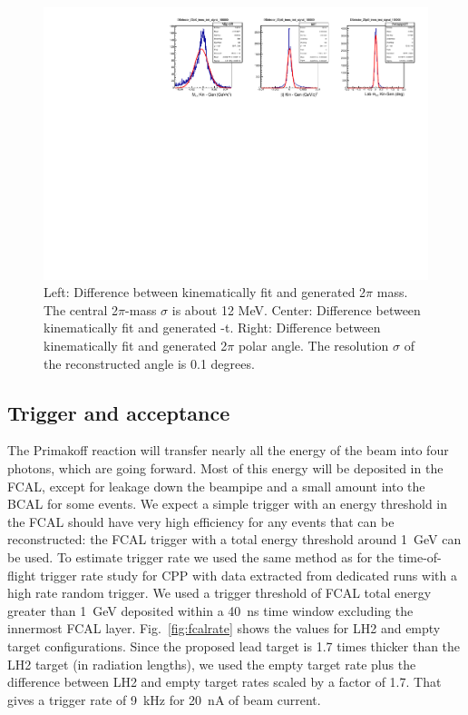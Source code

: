 \begin{figure}[tph]
\centering
\includegraphics[width=6in]{figures/Resolution_Mpipittag_signal_DSelector.pdf}
\caption{Left: Difference between kinematically fit and generated 2$\pi$ mass. The central 2$\pi$-mass $\sigma$ is about 12 MeV. Center: Difference between kinematically fit and generated -t. Right: Difference between kinematically fit and generated 2$\pi$ polar angle. The resolution $\sigma$ of the reconstructed angle is 0.1 degrees.
\label{fig:Resolution_Mpipittag_signal_DSelector}}
\end{figure}

\subsection{Trigger and acceptance}
The Primakoff reaction will transfer nearly all the energy of the beam
into four photons, which are going forward. Most of this energy will
be deposited in the FCAL, except for leakage down the beampipe and a
small amount into the BCAL for some events. We expect a simple trigger
with an energy threshold in the FCAL should have very high efficiency
for any events that can be reconstructed: the FCAL trigger with a
total energy threshold around 1~GeV can be used. To estimate trigger
rate we used the same method as for the time-of-flight trigger rate
study for CPP \cite{TOFrate} with data extracted from dedicated runs
with a high rate random trigger. We used a trigger threshold of FCAL
total energy greater than 1~GeV deposited within a 40~ns time window
excluding the innermost FCAL layer.  Fig.~\ref{fig:fcalrate} shows the
values for LH2 and empty target configurations.  Since the proposed
lead target is 1.7 times thicker than the LH2 target (in radiation
lengths), we used the empty target rate plus the difference between
LH2 and empty target rates scaled by a factor of 1.7. That gives a
trigger rate of 9~kHz for 20~nA of beam current.

